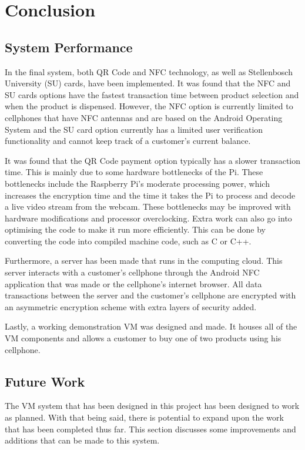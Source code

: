\chapter{Conclusion}
\label{chap:7}

\section{System Performance}

In the final system, both QR Code and NFC technology, as well as Stellenbosch University
(SU) cards, have been implemented. It was found that the NFC and SU cards options have the
fastest transaction time between product selection and when the product is dispensed.
However, the NFC option is currently limited to cellphones that have NFC antennas and are
based on the Android Operating System and the SU card option currently has a
limited user verification functionality and cannot keep track of a customer's
current balance.

It was found that the QR Code payment option typically has a slower transaction time. This
is mainly due to some hardware bottlenecks of the Pi. These bottlenecks include the
Raspberry Pi's moderate processing power, which increases the encryption time and the
time it takes the Pi to process and decode a live video stream from the webcam. These
bottlenecks may be improved with hardware modifications and processor overclocking. Extra
work can also go into optimising the code to make it run more efficiently. This can be
done by converting the code into compiled machine code, such as C or C++.

Furthermore, a server has been made that runs in the computing cloud. This server
interacts with a customer's cellphone through the Android NFC application that was made
or the cellphone's internet browser. All data transactions between the server and the
customer's cellphone are encrypted with an asymmetric encryption scheme with extra layers
of security added.

Lastly, a working demonstration VM was designed and made. It houses all of
the VM components and allows a customer to buy one of two products using
his cellphone. 

\section{Future Work}

The VM system that has been designed in this project has been designed to
work as planned. With that being said, there is potential to expand upon the work that has
been completed thus far. This section discusses some improvements and additions
that can be made to this system.

